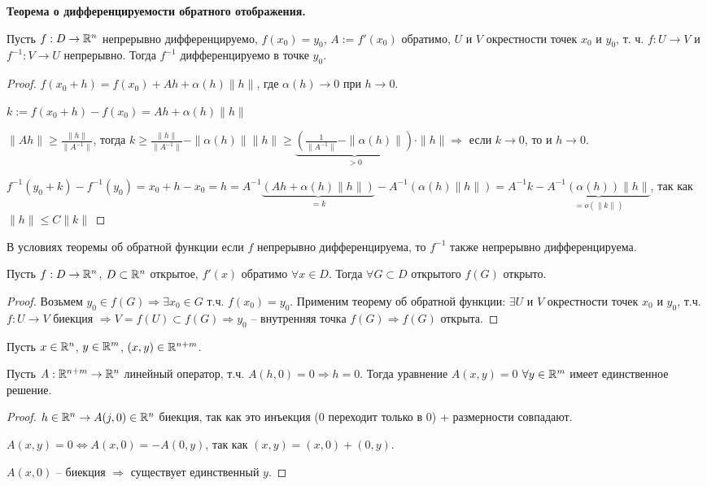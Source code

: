 \begin{theorem}
    \textbf{Теорема о дифференцируемости обратного отображения.}

    Пусть $f:D\rightarrow \mathbb{R}^n$ непрерывно дифференцируемо, $f(x_0)=y_0$, $A:=f'(x_0)$ обратимо, $U$ и $V$  окрестности точек $x_0$ и $y_0$, т. ч. $f:U\rightarrow V$ и $f^{-1}: V\rightarrow U$ непрерывно. Тогда $f^{-1}$ дифференцируемо в точке $y_0$.
\end{theorem}

\begin{proof}
    $f(x_0+h) = f(x_0) + Ah + \alpha(h) \|h\|$, где $ \alpha(h)\rightarrow 0$ при $h\rightarrow 0$.

    $k:= f(x_0+h) - f(x_0)=Ah + \alpha(h) \|h\|$
    
    $\|Ah\|\geq \frac{\|h\|}{\|A^{-1}\|}$, тогда $k\geq \frac{\|h\|}{\|A^{-1}\|} - \|\alpha(h)\| \|h\| \geq \underbrace{(\frac{1}{\|A^{-1}\|} - \|\alpha(h)\|)}_{>0}\cdot \|h\|\Rightarrow$ если $k\rightarrow 0$, то и $h\rightarrow 0$.

    $f^{-1}(y_0+k)-f^{-1}(y_0)=x_0+h-x_0=h=A^{-1}\underbrace{(Ah+\alpha(h) \|h\|)}_{=k}-A^{-1}(\alpha(h) \|h\|)=A^{-1}k-\underbrace{A^{-1}(\alpha(h)) \|h\|}_{=o(\|k\|)}$, так как $\|h\|\leq C\|k\|$
\end{proof}

\begin{corollary}
    В условиях теоремы об обратной функции если $f$ непрерывно дифференцируема, то $f^{-1}$ также непрерывно дифференцируема.
\end{corollary}

\begin{corollary}
    Пусть $f: D\rightarrow \mathbb{R}^n$, $D\subset \mathbb{R}^n$ открытое, $f'(x)$ обратимо $\forall x\in D$. Тогда $\forall G\subset D$ открытого $f(G)$ открыто.
\end{corollary}

\begin{proof}
    Возьмем $y_0\in f(G)\Rightarrow \exists x_0\in G$ т.ч. $f(x_0)=y_0$. Применим теорему об обратной функции: $\exists U$ и $V$ окрестности точек $x_0$ и $y_0$, т.ч. $f:U\rightarrow V$ биекция $\Rightarrow V=f(U)\subset f(G)\Rightarrow y_0$ – внутренняя точка $f(G)\Rightarrow f(G)$ открыта. 
\end{proof}

Пусть $x\in \mathbb{R}^n$, $y\in \mathbb{R}^m$, $(x, y)\in \mathbb{R}^{n+m}$.

\begin{statement}
    Пусть $A: \mathbb{R}^{n+m}\rightarrow \mathbb{R}^n$ линейный оператор, т.ч. $A(h, 0)=0\Rightarrow h=0$. Тогда уравнение $A(x, y)=0$ $\forall y\in \mathbb{R}^m$ имеет единственное решение.
\end{statement}

\begin{proof}
    $h\in \mathbb{R}^n\rightarrow A(j, 0)\in \mathbb{R}^n$ биекция, так как это инъекция (0 переходит только в 0) + размерности совпадают.

    $A(x, y)=0\Leftrightarrow A(x, 0)=-A(0, y)$, так как $(x, y)=(x, 0)+(0, y)$.

    $A(x, 0)$ – биекция $\Rightarrow$ существует единственный $y$.
\end{proof}